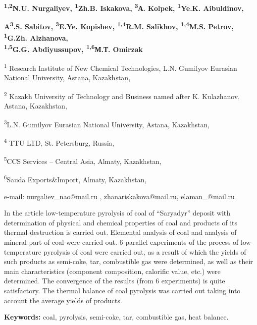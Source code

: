 
\begin{center}
{\bfseries \textsuperscript{1,2}N.U. Nurgaliyev\envelope, \textsuperscript{1}Zh.B.
Iskakova\envelope, \textsuperscript{3}А. Kolpek, \textsuperscript{1}Ye.K.
Aibuldinov\envelope,}

{\bfseries A\textsuperscript{3}.S. Sabitov, \textsuperscript{3}E.Ye.
Kopishev, \textsuperscript{1,4}R.M. Salikhov, \textsuperscript{1,4}M.S.
Petrov, \textsuperscript{1}G.Zh. Alzhanova,\\
\textsuperscript{1,5}G.G. Abdiyussupov, \textsuperscript{1,6}М.Т.
Omirzak}

\textsuperscript{1} Research Institute of New Chemical Technologies,
L.N. Gumilyov Eurasian National University, Astana, Kazakhstan,

\textsuperscript{2} Kazakh University of Technology and Business named
after K. Kulazhanov, Astana, Kazakhstan,

\textsuperscript{3}L.N. Gumilyov Eurasian National University, Astana,
Kazakhstan,

\textsuperscript{4} TTU LTD, St. Petersburg, Russia,

\textsuperscript{5}CCS Services -- Central Asia, Almaty, Kazakhstan,

\textsuperscript{6}Sauda Exports\&Import, Almaty, Kazakhstan,

e-mail: nurgaliev\_nao@mail.ru , zhanariskakova@mail.ru,
elaman\_@mail.ru
\end{center}

In the article low-temperature pyrolysis of coal of ``Saryadyr'' deposit
with determination of physical and chemical properties of coal and
products of its thermal destruction is carried out. Elemental analysis
of coal and analysis of mineral part of coal were carried out. 6
parallel experiments of the process of low-temperature pyrolysis of coal
were carried out, as a result of which the yields of such products as
semi-coke, tar, combustible gas were determined, as well as their main
characteristics (component composition, calorific value, etc.) were
determined. The convergence of the results (from 6 experiments) is quite
satisfactory. The thermal balance of coal pyrolysis was carried out
taking into account the average yields of products.

{\bfseries Keywords:} coal, pyrolysis, semi-coke, tar, combustible gas,
heat balance.

